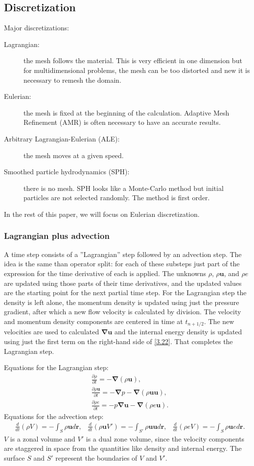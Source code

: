 \documentclass[letterpaper]{report}
\newcommand\bn{\boldsymbol{\nabla}}
\newcommand\br{\mathbf{r}}
\newcommand\bs{\boldsymbol}
\renewcommand{\(}{\left(}
\renewcommand{\)}{\right)}
\renewcommand{\[}{\left[}
\renewcommand{\]}{\right]}
\begin{document}
\subsection{Discretization}
Major discretizations:
\begin{description}
  \item[Lagrangian:] the mesh follows the material. This is very efficient in
  one dimension but for multidimensional problems, the mesh can be too
  distorted and new it is necessary to remesh the domain.
  \item[Eulerian:] the mesh is fixed at the beginning of the calculation.
  Adaptive Mesh Refinement (AMR) is often necessary to have an accurate
  results.
  \item[Arbitrary Lagrangian-Eulerian (ALE):] the mesh moves at a given speed.
  \item[Smoothed particle hydrodynamics (SPH):] there is no mesh. SPH looks
  like a Monte-Carlo method but initial particles are not selected randomly.
  The method is first order.
\end{description}
In the rest of this paper, we will focus on Eulerian discretization.
\subsubsection{Lagrangian plus advection}
A time step consists of a ''Lagrangian'' step followed by an advection step.
The idea is the same than operator split: for each of these substeps just part
of the expression for the time derivative of each  is applied. The unknowns
$\rho$, $\rho\bs{u}$, and $\rho e$ are updated using those parts of their time
derivatives, and the updated values are the starting point for the next
partial time step. For the Lagrangian step the density is left alone, the
momentum density is updated using just the pressure gradient, after which a
new flow velocity is calculated by division. The velocity and momentum density
components are centered in time at $t_{n+1/2}$. The new velocities are used to
calculated $\bn\bs{u}$ and the internal energy density is updated using just
the first term on the right-hand side of \cref{3.22}. That completes the
Lagrangian step.

Equations for the Lagrangian step:
\begin{align}
  &\frac{\partial \rho}{\partial t} = -\bn (\rho \bs{u}),\\
  &\frac{\partial \rho \bs{u}}{\partial t} = -\bn p - \bn(\rho
  \bs{u}\bs{u}),\\
  &\frac{\partial \rho e}{\partial t} = -p\bn\bs{u} - \bn (\rho e \bs{u})
  \label{3.22}.
\end{align}
Equations for the advection step:
\begin{align}
  &\frac{d}{dt}(\rho V) = -\int_S \rho \bs{u}d\br,
  &\frac{d}{dt}(\rho \bs{u}V') = -\int_{S'} \rho \bs{u}\bs{u} d\br,
  &\frac{d}{dt}(\rho e V) = -\int_S \rho \bs{u}e d\br.
\end{align}
$V$ is a zonal volume and $V'$ is a dual zone volume, since the velocity
components are staggered in space from the quantities like density and
internal energy. The surface $S$ and $S'$ represent the boundaries of $V$ and
$V'$.
\end{document}
